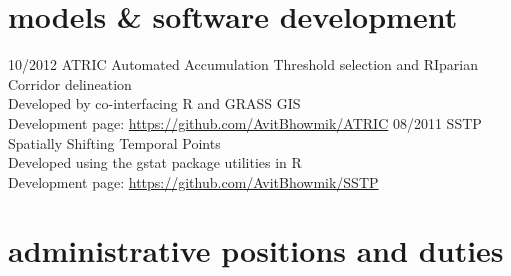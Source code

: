 \documentclass[]{friggeri-cv} %
\begin{document}
\newpage
\section{models \& software development}

\begin{entrylist}
\entry
{\small{10/2012}}
{ATRIC}
{}
{Automated Accumulation Threshold selection and RIparian Corridor delineation \\
Developed by co-interfacing R and GRASS GIS \\
Development page: \href{https://github.com/AvitBhowmik/ATRIC}{https://github.com/AvitBhowmik/ATRIC}}
\entry
{\small{08/2011}}
{SSTP}
{}
{Spatially Shifting Temporal Points \\
Developed using the gstat package utilities in R \\
Development page: \href{https://github.com/AvitBhowmik/SSTP}{https://github.com/AvitBhowmik/SSTP}}
\end{entrylist}

\section{administrative positions and duties}
\end{document}

